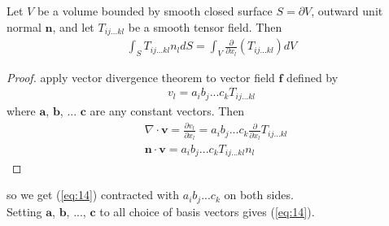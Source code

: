 \documentclass[a4paper]{article}
\begin{document}
\begin{thm}
Let $V$ be a volume bounded by smooth closed surface $S=\partial V$, outward unit normal $\mathbf{n}$, and let $T_{ij...kl}$ be a smooth tensor field. Then
\begin{equation}\label{eq:14}
\begin{aligned}
\int_S T_{ij...kl} n_l dS = \int_V \frac{\partial}{\partial x_l} \left(T_{ij...kl}\right) dV
\end{aligned}
\end{equation}
\begin{proof}
apply vector divergence theorem to vector field $\mathbf{f}$ defined by
\begin{equation*}
\begin{aligned}
v_l = a_i b_j ... c_k T_{ij...kl}
\end{aligned}
\end{equation*}
where $\mathbf{a}$, $\mathbf{b}$, ... $\mathbf{c}$ are any constant vectors. Then
\begin{equation*}
\begin{aligned}
&\nabla\cdot\mathbf{v} = \frac{\partial v_l}{\partial x_l} = a_i b_j ... c_k \frac{\partial}{\partial x_l} T_{ij...kl}\\
&\mathbf{n}\cdot\mathbf{v} = a_i b_j ... c_k T_{ij...kl} n_l
\end{aligned}
\end{equation*}
\end{proof}
so we get (\ref{eq:14}) contracted with $a_i b_j ... c_k$ on both sides.\\
Setting $\mathbf{a}$, $\mathbf{b}$, ..., $\mathbf{c}$ to all choice of basis vectors gives (\ref{eq:14}).
\end{thm}
\end{document}
